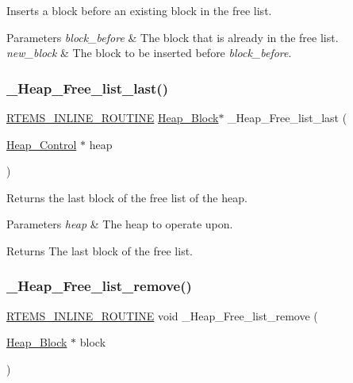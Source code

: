 Inserts a block before an existing block in the free list. 


\begin{DoxyParams}{Parameters}
{\em block\+\_\+before} & The block that is already in the free list. \\
\hline
{\em new\+\_\+block} & The block to be inserted before {\itshape block\+\_\+before}. \\
\hline
\end{DoxyParams}
\mbox{\label{group__RTEMSScoreHeap_ga26aaa1feb8cf3773e5e38a13afcc4efe}} 
\subsubsection{\texorpdfstring{\_Heap\_Free\_list\_last()}{\_Heap\_Free\_list\_last()}}
{\footnotesize\ttfamily \mbox{\hyperlink{group__RTEMSScoreBaseDefs_gac216239df231d5dbd15e3520b0b9313f}{R\+T\+E\+M\+S\+\_\+\+I\+N\+L\+I\+N\+E\+\_\+\+R\+O\+U\+T\+I\+NE}} \mbox{\hyperlink{structHeap__Block}{Heap\+\_\+\+Block}}$\ast$ \+\_\+\+Heap\+\_\+\+Free\+\_\+list\+\_\+last (\begin{DoxyParamCaption}\item[{\mbox{\hyperlink{structHeap__Control}{Heap\+\_\+\+Control}} $\ast$}]{heap }\end{DoxyParamCaption})}



Returns the last block of the free list of the heap. 


\begin{DoxyParams}{Parameters}
{\em heap} & The heap to operate upon.\\
\hline
\end{DoxyParams}
\begin{DoxyReturn}{Returns}
The last block of the free list. 
\end{DoxyReturn}
\mbox{\label{group__RTEMSScoreHeap_ga73da7f4190c5ae1af555374509a5e302}} 
\subsubsection{\texorpdfstring{\_Heap\_Free\_list\_remove()}{\_Heap\_Free\_list\_remove()}}
{\footnotesize\ttfamily \mbox{\hyperlink{group__RTEMSScoreBaseDefs_gac216239df231d5dbd15e3520b0b9313f}{R\+T\+E\+M\+S\+\_\+\+I\+N\+L\+I\+N\+E\+\_\+\+R\+O\+U\+T\+I\+NE}} void \+\_\+\+Heap\+\_\+\+Free\+\_\+list\+\_\+remove (\begin{DoxyParamCaption}\item[{\mbox{\hyperlink{structHeap__Block}{Heap\+\_\+\+Block}} $\ast$}]{block }\end{DoxyParamCaption})}



